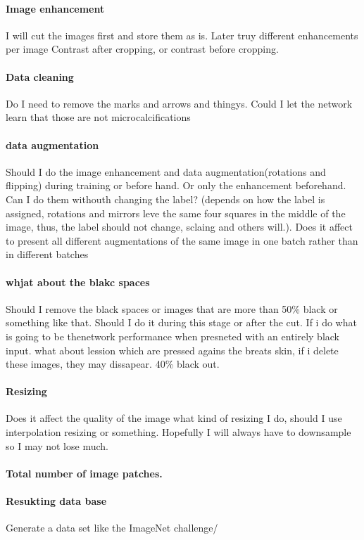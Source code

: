 \paragraph{Image enhancement}
I will cut the images first and store them as is. Later truy different enhancements per image
Contrast after cropping, or contrast before cropping.
\paragraph{Data cleaning}
Do I need to remove the marks and arrows and thingys. Could I let the network learn that those are not microcalcifications

\paragraph{data augmentation}
Should I do the image enhancement and data augmentation(rotations and flipping) during training or before hand. Or only the enhancement beforehand. Can I do them withouth changing the label? (depends on how the label is assigned, rotations and mirrors leve the same four squares in the middle of the image, thus, the label should not change, sclaing and others will.). Does it affect to present all different augmentations of the same image in one batch rather than in different batches

\paragraph{whjat about the blakc spaces}
Should I remove the black spaces or images that are more than 50\% black or something like that. Should I do it during this stage or after the cut. If i do what is going to be thenetwork performance when presneted with an entirely black input. what about lession which are pressed agains the breats skin, if i delete these images, they may dissapear.
40\% black out.

\paragraph{Resizing}
Does it affect the quality of the image what kind of resizing I do, should I use interpolation resizing or something. Hopefully I will always have to downsample so I may not lose much.

\paragraph{Total number of image patches.}

\paragraph{Resukting data base}
Generate a data set like the ImageNet challenge/

